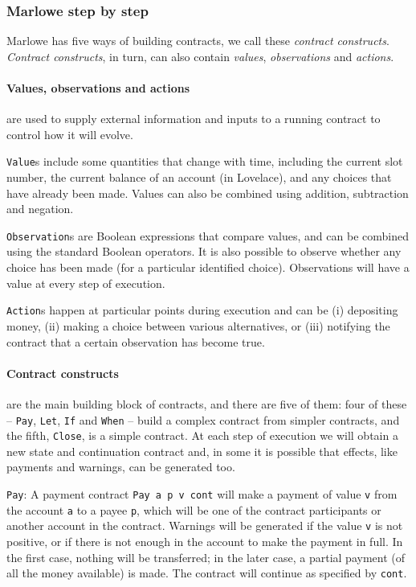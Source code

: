 \documentclass[runningheads]{llncs}
\begin{document}
\subsubsection*{Marlowe step by step}

Marlowe has five ways of building contracts, we call these \emph{contract constructs}. \emph{Contract constructs}, in turn, can also contain \emph{values}, \emph{observations} and \emph{actions}.

\paragraph{Values, observations and actions} are used to supply external information and inputs to a running contract to control how it will evolve.

\texttt{Value}s include some quantities that change with time, including the current slot number, the current balance of an account (in Lovelace), and any choices that have already been made. %
Values can also be combined using addition, subtraction and negation.

\texttt{Observation}s are Boolean expressions that compare values, and can be combined using the standard Boolean operators. It is also possible to observe whether any choice has been made (for a particular identified choice). Observations will have a value at every step of execution.

\texttt{Action}s happen at particular points during execution and can be (i) depositing money, (ii) making a choice between various alternatives, or (iii) notifying the contract that a certain observation has become true.

\paragraph{Contract constructs} are the main building block of contracts, and there are five of them: four of these -- \texttt{Pay}, \texttt{Let}, \texttt{If} and \texttt{When} -- build a complex contract from simpler contracts, and the fifth, \texttt{Close}, is a simple contract. At each step of execution we will obtain a new state and continuation contract and, in some it is possible that effects, like payments and warnings, can be generated too.

\texttt{Pay}: A payment contract \texttt{Pay a p v cont} will make a payment of value \texttt{v} from the account \texttt{a} to a payee \texttt{p}, which will be one of the contract participants or another account in the contract. Warnings will be generated if the value \texttt{v} is not positive, or if there is not enough in the account to make the payment in full. In the first case, nothing will be transferred; in the later case, a partial payment (of all the money available) is made. The contract will continue as specified by \texttt{cont}.
\end{document}

